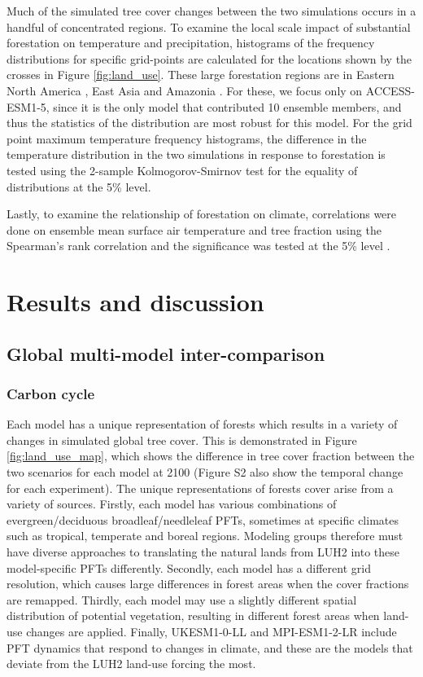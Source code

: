 \documentclass[draft]{agujournal2019}
\begin{document}
Much of the simulated tree cover changes between the two simulations occurs in a handful of concentrated regions.
To examine the local scale impact of substantial forestation on temperature and precipitation, histograms of the frequency distributions for specific grid-points are calculated for the locations shown by the crosses in Figure \ref{fig:land_use}.
These large forestation regions are in Eastern North America , East Asia  and Amazonia .
For these, we focus only on ACCESS-ESM1-5, since it is the only model that contributed 10 ensemble members, and thus the statistics of the distribution are most robust for this model.
For the grid point maximum temperature frequency histograms, the difference in the temperature distribution in the two simulations in response to forestation is tested using the 2-sample Kolmogorov-Smirnov test for the equality of distributions at the 5\% level.

Lastly, to examine the relationship of forestation on climate, correlations were done on ensemble mean surface air temperature and tree fraction using the Spearman's rank correlation and the significance was tested at the 5\% level \cite{kokoska2000crc}.

\section{Results and discussion}

\subsection{Global multi-model inter-comparison}

\subsubsection{Carbon cycle}

Each model has a unique representation of forests which results in a variety of changes in simulated global tree cover.
This is demonstrated in Figure \ref{fig:land_use_map}, which shows the difference in tree cover fraction between the two scenarios for each model at 2100 (Figure S2 also show the temporal change for each experiment).
The unique representations of forests cover arise from a variety of sources.
Firstly, each model has various combinations of evergreen/deciduous broadleaf/needleleaf PFTs, sometimes at specific climates such as tropical, temperate and boreal regions.
Modeling groups therefore must have diverse approaches to translating the natural lands from LUH2 into these model-specific PFTs differently.
Secondly, each model has a different grid resolution, which causes large differences in forest areas when the cover fractions are remapped.
Thirdly, each model may use a slightly different spatial distribution of potential vegetation, resulting in different forest areas when land-use changes are applied.
Finally, UKESM1-0-LL and MPI-ESM1-2-LR include PFT dynamics that respond to changes in climate, and these are the models that deviate from the LUH2 land-use forcing the most.
\end{document}
